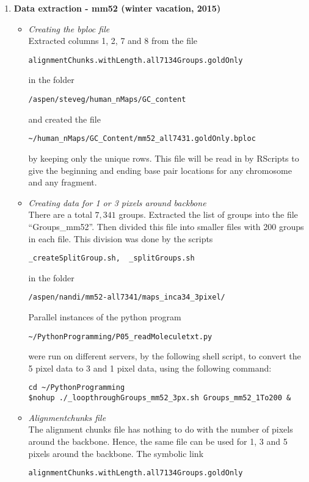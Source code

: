 \documentclass[11pt]{article}
\begin{document}
\begin{enumerate}
\item
{\bf{Data extraction - mm52 (winter vacation, 2015)}}
\begin{itemize}
\item \emph{Creating the bploc file} \\
Extracted columns 1, 2, 7 and 8 from the file 
\begin{verbatim}
alignmentChunks.withLength.all7134Groups.goldOnly
\end{verbatim}
in the folder
\begin{verbatim}
/aspen/steveg/human_nMaps/GC_content
\end{verbatim}
and created the file 
\begin{verbatim}
~/human_nMaps/GC_Content/mm52_all7431.goldOnly.bploc
\end{verbatim} 
by keeping only the unique rows. This file will be read in by RScripts to give the beginning and ending base pair locations for any chromosome and any fragment.
\item \emph{Creating data for 1 or 3 pixels around backbone} \\
There are a total $7,341$ groups. Extracted the list of groups into the file ``Groups\_mm52''. Then divided this file into smaller files with 200 groups in each file. This division was done by the scripts 
\begin{verbatim}
_createSplitGroup.sh,  _splitGroups.sh
\end{verbatim}
in the folder 
\begin{verbatim}
/aspen/nandi/mm52-all7341/maps_inca34_3pixel/
\end{verbatim}
Parallel instances of the python program 
\begin{verbatim}
~/PythonProgramming/P05_readMoleculetxt.py
\end{verbatim}
were run on different servers, by the following shell script, to convert the 5 pixel data to 3 and 1 pixel data, using the following command:
\begin{verbatim}
cd ~/PythonProgramming
$nohup ./_loopthroughGroups_mm52_3px.sh Groups_mm52_1To200 &
\end{verbatim}
\item \emph{Alignmentchunks file} \\
The alignment chunks file has nothing to do with the number of pixels around the backbone. Hence, the same file can be used for 1, 3 and 5 pixels around the backbone. The symbolic link 
\begin{verbatim}
alignmentChunks.withLength.all7134Groups.goldOnly

\end{verbatim}
\end{itemize}
\end{enumerate}
\end{document}
